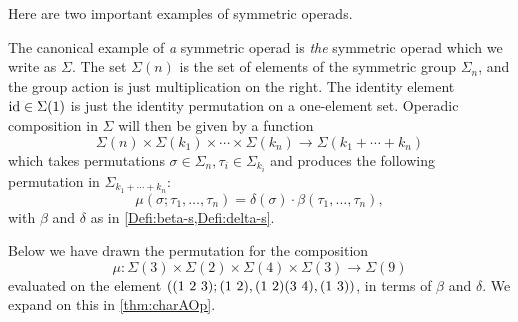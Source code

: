 Here are two important examples of symmetric operads.

\begin{example}\label{ex:Sigma}
The canonical example of \emph{a} symmetric operad is \emph{the} symmetric operad which we write as $\Sigma$. The set $\Sigma(n)$ is the set of elements of the symmetric group $\Sigma_{n}$, and the group action is just multiplication on the right. The identity element $\textrm{id} \in \Sigma(1)$ is just the identity permutation on a one-element set. Operadic composition in $\Sigma$ will then be given by a function
  \[
    \Sigma(n) \times \Sigma(k_{1}) \times \cdots \times \Sigma(k_{n}) \rightarrow \Sigma(k_{1} + \cdots + k_{n})
  \]
which takes permutations $\sigma \in \Sigma_{n}, \tau_{i} \in \Sigma_{k_{i}}$ and produces the following permutation in $\Sigma_{k_{1} + \cdots + k_{n}}$:
  \[
    \mu(\sigma; \tau_{1}, \ldots, \tau_{n}) = \delta(\sigma) \cdot \beta(\tau_1,\ldots,\tau_n),
  \]
with $\beta$ and $\delta$ as in \cref{Defi:beta-s,Defi:delta-s}.

Below we have drawn the permutation for the composition
  \[
    \mu \colon \Sigma(3) \times \Sigma(2) \times \Sigma(4) \times \Sigma(3) \rightarrow \Sigma(9)
  \]
evaluated on the element $\left( (1 \,\, 2 \,\, 3); ( 1 \, \, 2 ),( 1 \, \, 2 )( 3 \, \, 4 ),( 1 \, \, 3 ) \right)$, in terms of $\beta$ and $\delta$. We expand on this in \cref{thm:charAOp}.
  \begin{center}
  \end{center}
  

\end{example}
